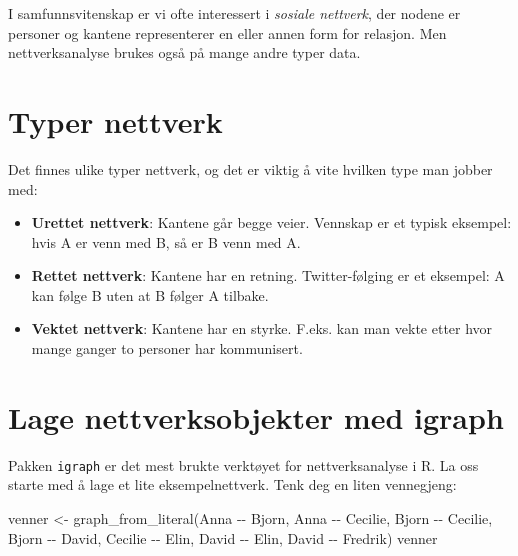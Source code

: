 \documentclass[
  norsk,
  letterpaper,
  DIV=11,
  numbers=noendperiod]{scrreprt}
\newenvironment{Shaded}{\begin{snugshade}}{\end{snugshade}}
\newcommand{\FunctionTok}[1]{\textcolor[rgb]{0.28,0.35,0.67}{#1}}
\newcommand{\NormalTok}[1]{\textcolor[rgb]{0.00,0.23,0.31}{#1}}
\newcommand{\OtherTok}[1]{\textcolor[rgb]{0.00,0.23,0.31}{#1}}
\newcommand{\SpecialCharTok}[1]{\textcolor[rgb]{0.37,0.37,0.37}{#1}}
\providecommand{\tightlist}{%
  \setlength{\itemsep}{0pt}\setlength{\parskip}{0pt}}
\theoremstyle{definition}
\theoremstyle{remark}
\begin{document}
I samfunnsvitenskap er vi ofte interessert i \emph{sosiale nettverk},
der nodene er personer og kantene representerer en eller annen form for
relasjon. Men nettverksanalyse brukes også på mange andre typer data.

\section{Typer nettverk}\label{typer-nettverk}

Det finnes ulike typer nettverk, og det er viktig å vite hvilken type
man jobber med:

\begin{itemize}
\tightlist
\item
  \textbf{Urettet nettverk}: Kantene går begge veier. Vennskap er et
  typisk eksempel: hvis A er venn med B, så er B venn med A.
\item
  \textbf{Rettet nettverk}: Kantene har en retning. Twitter-følging er
  et eksempel: A kan følge B uten at B følger A tilbake.
\item
  \textbf{Vektet nettverk}: Kantene har en styrke. F.eks. kan man vekte
  etter hvor mange ganger to personer har kommunisert.
\end{itemize}

\section{Lage nettverksobjekter med
igraph}\label{lage-nettverksobjekter-med-igraph}

Pakken \texttt{igraph} er det mest brukte verktøyet for nettverksanalyse
i R. La oss starte med å lage et lite eksempelnettverk. Tenk deg en
liten vennegjeng:

\begin{Shaded}
\begin{Highlighting}[]
\NormalTok{venner }\OtherTok{\textless{}{-}} \FunctionTok{graph\_from\_literal}\NormalTok{(Anna }\SpecialCharTok{{-}{-}}\NormalTok{ Bjorn,}
\NormalTok{                             Anna }\SpecialCharTok{{-}{-}}\NormalTok{ Cecilie,}
\NormalTok{                             Bjorn }\SpecialCharTok{{-}{-}}\NormalTok{ Cecilie,}
\NormalTok{                             Bjorn }\SpecialCharTok{{-}{-}}\NormalTok{ David,}
\NormalTok{                             Cecilie }\SpecialCharTok{{-}{-}}\NormalTok{ Elin,}
\NormalTok{                             David }\SpecialCharTok{{-}{-}}\NormalTok{ Elin,}
\NormalTok{                             David }\SpecialCharTok{{-}{-}}\NormalTok{ Fredrik)}
\NormalTok{venner}
\end{Highlighting}
\end{Shaded}
\end{document}

